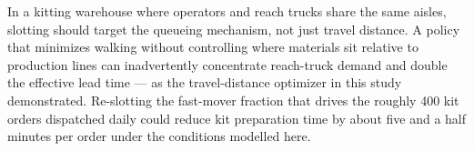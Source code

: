 In a kitting warehouse where operators and reach trucks share the same
aisles, slotting should target the queueing mechanism, not just travel
distance. A policy that minimizes walking without controlling where
materials sit relative to production lines can inadvertently concentrate
reach-truck demand and double the effective lead time --- as the
travel-distance optimizer in this study demonstrated. Re-slotting the
fast-mover fraction that drives the roughly 400 kit orders dispatched
daily could reduce kit preparation time by about five and a half minutes
per order under the conditions modelled here.
